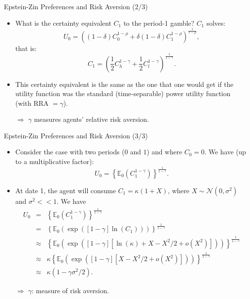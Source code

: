 \begin{frame}{Epstein-Zin Preferences and Risk Aversion (2/3)}
\begin{footnotesize}
\begin{itemize}
	\item What is the certainty equivalent $C_1$ to the period-1 gamble? $C_1$ solves:
	$$
	U_0 = \left((1-\delta)C_0^{1-\rho} + \delta (1-\delta) C_1^{1-\rho}\right)^{\frac{1}{1-\rho}},
	$$
	that is:
	$$
	C_1 = \left(\frac{1}{2}C_h^{1-\gamma}+\frac{1}{2}C_l^{1-\gamma}\right)^{\frac{1}{1-\gamma}}.
	$$
	\item This certainty equivalent is the same as the one that one would get if the utility function was the standard (time-separable) power utility function (with RRA $= \gamma$).
	\item[$\Rightarrow$] $\gamma$ measures agents' relative risk aversion.
\end{itemize}
\end{footnotesize}
\end{frame}

\begin{frame}{Epstein-Zin Preferences and Risk Aversion (3/3)}
\begin{footnotesize}
\begin{itemize}
	\item Consider the case with two periods ($0$ and $1$) and where $C_0=0$. We have (up to a multiplicative factor):
	$$
	U_0 = \left\{\mathbb{E}_0(C_{1}^{1-\gamma})\right\}^{\frac{1}{1-\gamma}}.
	$$
	\item At date 1, the agent will consume $C_1 = \kappa(1+X)$, where $X \sim \mathcal{N}(0,\sigma^2)$ and $\sigma^2<<1$. We have
	\begin{eqnarray*}
	U_0 &=& \left\{\mathbb{E}_0(C_{1}^{1-\gamma})\right\}^{\frac{1}{1-\gamma}}\\
	&=& \left\{\mathbb{E}_0(\exp([1-\gamma]\ln(C_1)))\right\}^{\frac{1}{1-\gamma}}\\
	&\approx& \left\{\mathbb{E}_0(\exp([1-\gamma][\ln(\kappa) + X - X^2/2 + o(X^2)]))\right\}^{\frac{1}{1-\gamma}}\\
	&\approx& \kappa \left\{\mathbb{E}_0(\exp([1-\gamma][X-X^2/2 + o(X^2)]))\right\}^{\frac{1}{1-\gamma}}\\
	&\approx& \kappa (1-\gamma\sigma^2/2).
	\end{eqnarray*}
	\item[$\Rightarrow$] $\gamma$: measure of risk aversion.
\end{itemize}
\end{footnotesize}
\end{frame}

